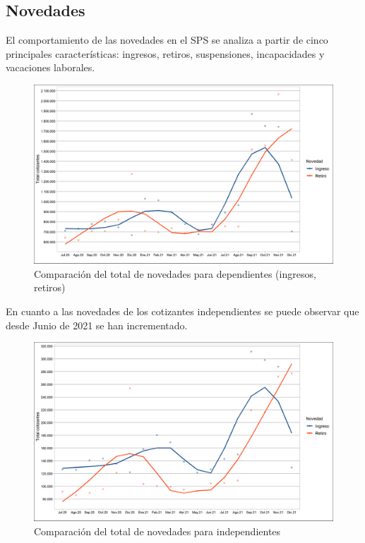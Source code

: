 \subsection{Novedades}

El comportamiento de las novedades en el SPS se analiza a partir de cinco principales características: ingresos, retiros, suspensiones, incapacidades y vacaciones laborales.

\begin{figure}
\includegraphics[width = 11.5cm]{figures/01_dinamica/total_novedades_dependientes_ingret.png}
\caption{Comparación del total de novedades para dependientes (ingresos, retiros)}
\label{figura:novedad:sectorprivado:IR}
\end{figure}
En cuanto a las novedades de los cotizantes independientes se puede observar que desde Junio de 2021 se han incrementado. 

\begin{figure}
\includegraphics[width = 11.5cm]{figures/01_dinamica/total_novedades_independientes_ingret.png}
\caption{Comparación del total de novedades para independientes}
\label{figura:novedad:sectorprivado:IR}
\end{figure}


